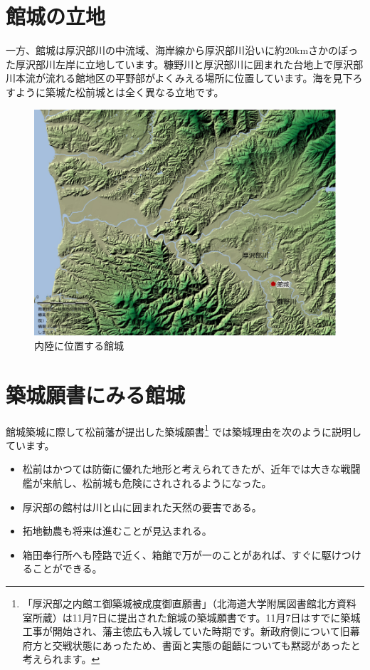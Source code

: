 \documentclass[11pt,report]{jsbook}
\begin{document}
\section{館城の立地}
一方、館城は厚沢部川の中流域、海岸線から厚沢部川沿いに約20kmさかのぼった厚沢部川左岸に立地しています。糠野川と厚沢部川に囲まれた台地上で厚沢部川本流が流れる館地区の平野部がよくみえる場所に位置しています。海を見下ろすように築城た松前城とは全く異なる立地です。

\begin{figure}[h]
\centering
\includegraphics[width=160truemm]{fig/02map.pdf}
\caption{内陸に位置する館城}
\label{fig02}
\end{figure}

\section{築城願書にみる館城}
館城築城に際して松前藩が提出した築城願書\footnote{
「厚沢部之内館エ御築城被成度御直願書」（北海道大学附属図書館北方資料室所蔵）は11月7日に提出された館城の築城願書です。11月7日はすでに築城工事が開始され、藩主徳広も入城していた時期です。新政府側について旧幕府方と交戦状態にあったため、書面と実態の齟齬についても黙認があったと考えられます。
}
では築城理由を次のように説明しています。

\begin{itemize}
\item 松前はかつては防衛に優れた地形と考えられてきたが、近年では大きな戦闘艦が来航し、松前城も危険にされされるようになった。
\item 厚沢部の館村は川と山に囲まれた天然の要害である。
\item 拓地勧農も将来は進むことが見込まれる。
\item 箱田奉行所へも陸路で近く、箱館で万が一のことがあれば、すぐに駆けつけることができる。
\end{itemize}
\end{document}
